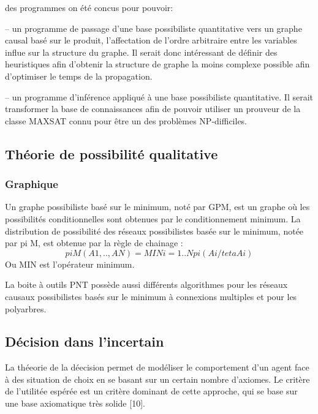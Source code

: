 des programmes on été concus pour pouvoir:

– un programme de passage d’une base possibiliste quantitative vers un graphe causal basé sur le produit, l’affectation de l’ordre arbitraire entre les variables influe sur la structure du graphe. Il serait donc intéressant de définir des heuristiques afin d’obtenir la structure de graphe la moins complexe possible afin d’optimiser
le temps de la propagation.

– un programme d’inférence appliqué à une base possibiliste quantitative. Il serait transformer la base de connaissances afin de pouvoir utiliser un prouveur de la classe MAXSAT connu pour être un des problèmes NP-difficiles.\cite{hkhallafiThesis}

\subsection{Théorie de possibilité qualitative}
\subsubsection{Graphique}

Un graphe possibiliste basé sur le minimum, noté par GPM, est un graphe où les possibilités conditionnelles sont obtenues par le conditionnement minimum. La distribution de possibilité des réseaux possibilistes basée sur le minimum, notée par pi M, est obtenue par la règle de chainage :
\begin{equation}
 pi M (A1, .., AN) = MINi=1..N pi (Ai/teta Ai) 
\end{equation}
Ou MIN est  l’opérateur minimum.

La boite à outils PNT possède aussi différents algorithmes pour les réseaux causaux possibilistes basés sur le minimum à connexions multiples et pour les polyarbres. 

\subsection{Décision dans l’incertain}
La théeorie de la déecision permet de modéliser le comportement d'un agent face
à des situation de choix en se basant sur un certain nombre d'axiomes. Le critère
de l'utilitée espérée est un critère dominant de cette approche, qui se base sur une
base axiomatique très solide [10].
